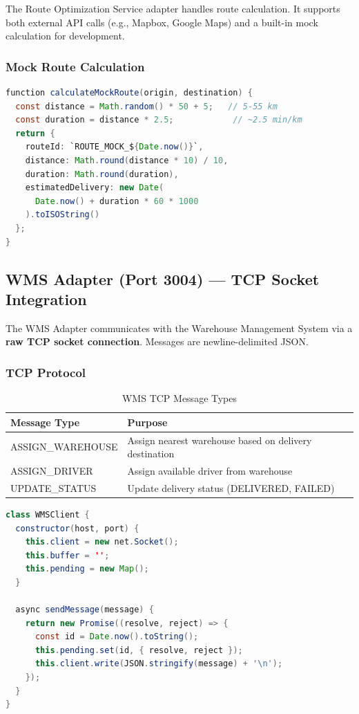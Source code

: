 \documentclass[12pt,a4paper]{article}
\begin{document}
The Route Optimization Service adapter handles route calculation. It supports both external API calls (e.g., Mapbox, Google Maps) and a built-in mock calculation for development.

\subsubsection{Mock Route Calculation}

\begin{lstlisting}[language=java, caption={Mock Route Calculation}]
function calculateMockRoute(origin, destination) {
  const distance = Math.random() * 50 + 5;   // 5-55 km
  const duration = distance * 2.5;            // ~2.5 min/km
  return {
    routeId: `ROUTE_MOCK_${Date.now()}`,
    distance: Math.round(distance * 10) / 10,
    duration: Math.round(duration),
    estimatedDelivery: new Date(
      Date.now() + duration * 60 * 1000
    ).toISOString()
  };
}
\end{lstlisting}

\subsection{WMS Adapter (Port 3004) — TCP Socket Integration}

The WMS Adapter communicates with the Warehouse Management System via a \textbf{raw TCP socket connection}. Messages are newline-delimited JSON.

\subsubsection{TCP Protocol}

\begin{table}[H]
\centering
\caption{WMS TCP Message Types}
\begin{tabularx}{\textwidth}{lX}
\toprule
\textbf{Message Type} & \textbf{Purpose} \\
\midrule
ASSIGN\_WAREHOUSE & Assign nearest warehouse based on delivery destination \\
ASSIGN\_DRIVER & Assign available driver from warehouse \\
UPDATE\_STATUS & Update delivery status (DELIVERED, FAILED) \\
\bottomrule
\end{tabularx}
\end{table}

\begin{lstlisting}[language=java, caption={TCP Client Connection}]
class WMSClient {
  constructor(host, port) {
    this.client = new net.Socket();
    this.buffer = '';
    this.pending = new Map();
  }

  async sendMessage(message) {
    return new Promise((resolve, reject) => {
      const id = Date.now().toString();
      this.pending.set(id, { resolve, reject });
      this.client.write(JSON.stringify(message) + '\n');
    });
  }
}
\end{lstlisting}
\end{document}
